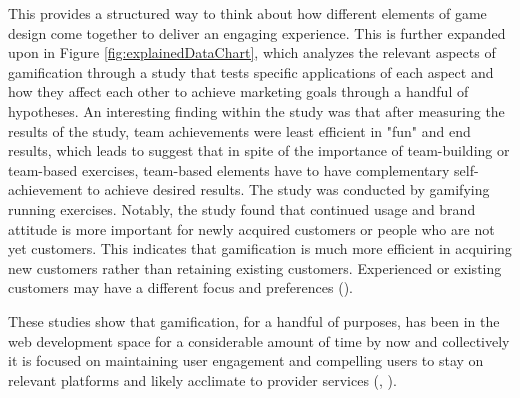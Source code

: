 This provides a structured way to think about how different elements of game design come together to deliver an engaging experience. 
This is further expanded upon in Figure \ref{fig:explainedDataChart}, which analyzes the relevant aspects of gamification through a study that tests specific applications of each aspect and how they affect each other to achieve marketing goals through a handful of hypotheses. 
An interesting finding within the study was that after measuring the results of the study, team achievements were least efficient in "fun" and end results, which leads to suggest that in spite of the importance of team-building or team-based exercises, team-based elements have to have complementary self-achievement to achieve desired results. 
The study was conducted by gamifying running exercises. 
Notably, the study found that continued usage and brand attitude is more important for newly acquired customers or people who are not yet customers. 
This indicates that gamification is much more efficient in acquiring new customers rather than retaining existing customers. 
Experienced or existing customers may have a different focus and preferences (\cite{sustainability}).

These studies show that gamification, for a handful of purposes, has been in the web development space for a considerable amount of time by now and collectively it is focused on maintaining user engagement and compelling users to stay on relevant platforms and likely acclimate to provider services (\cite{userEngagement}, \cite{gamificationEngagement}).
%
\newpage